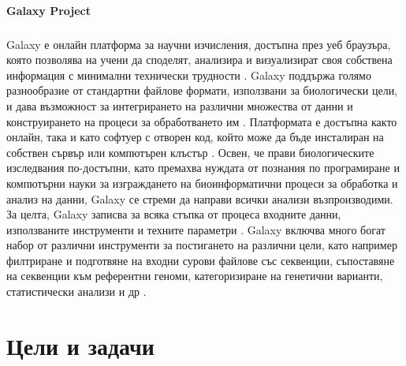 \documentclass[pdftex,cyrillic,14pt,a4page,twoside,openright]{extreport}
\begin{document}
\subsubsection{Galaxy Project}
\paragraph{}
Galaxy е онлайн платформа за научни изчисления, достъпна през уеб браузъра, която позволява на учени да споделят, анализира и визуализират своя собствена информация с минимални технически трудности \cite{galaxy2022}. Galaxy поддържа голямо разнообразие от стандартни файлове формати, използвани за биологически цели, и дава възможност за интегрирането на различни множества от данни и конструирането на процеси за обработването им \cite{blankenberg2011}. Платформата е достъпна както онлайн, така и като софтуер с отворен код, който може да бъде инсталиран на собствен сървър или компютърен клъстър \cite{nekrutenko2010}. Освен, че прави биологическите изследвания по-достъпни, като премахва нуждата от познания по програмиране и компютърни науки за изграждането на биоинформатични процеси за обработка и анализ на данни, Galaxy се стреми да направи всички анализи възпроизводими. За целта, Galaxy записва за всяка стъпка от процеса входните данни, използваните инструменти и техните параметри \cite{schatz2010}. Galaxy включва много богат набор от различни инструменти за постигането на различни цели, като например филтриране и подготвяне на входни сурови файлове със секвенции, съпоставяне на секвенции към референтни геноми, категоризиране на генетични варианти, статистически анализи и др \cite{schatz2010}.

\chapter{Цели и задачи}
\end{document}
